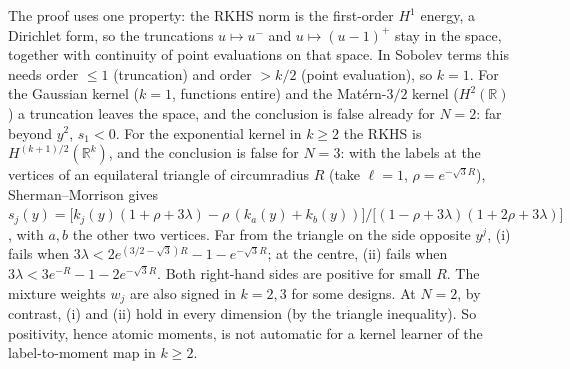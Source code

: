 \begin{remark}[Scope: the lemma is a $k=1$ result]
The proof uses one property: the RKHS norm is the first-order $H^1$ energy, a Dirichlet form, so
the truncations $u\mapsto u^-$ and $u\mapsto(u-1)^+$ stay in the space, together with continuity
of point evaluations on that space. In Sobolev terms this needs order $\le1$ (truncation) and
order $>k/2$ (point evaluation), so $k=1$. For the Gaussian kernel ($k=1$, functions entire) and
the Mat\'ern-$3/2$ kernel ($H^2(\mathbb R)$) a truncation leaves the space, and the conclusion is
false already for $N=2$: far beyond $y^2$, $s_1<0$. For the exponential kernel in $k\ge2$ the
RKHS is $H^{(k+1)/2}(\mathbb R^k)$, and the conclusion is false for $N=3$: with the labels at the
vertices of an equilateral triangle of circumradius $R$ (take $\ell=1$, $\rho=e^{-\sqrt3R}$),
Sherman--Morrison gives
$s_j(y)=\big[k_j(y)(1+\rho+3\lambda)-\rho\,(k_a(y)+k_b(y))\big]/\big[(1-\rho+3\lambda)(1+2\rho+3\lambda)\big]$,
with $a,b$ the other two vertices. Far from the triangle on the side opposite $y^j$, (i) fails when
$3\lambda<2e^{(3/2-\sqrt3)R}-1-e^{-\sqrt3R}$; at the centre, (ii) fails when
$3\lambda<3e^{-R}-1-2e^{-\sqrt3R}$. Both right-hand sides are positive for small $R$. The
mixture weights $w_j$ are also signed in $k=2,3$ for some designs. At $N=2$, by contrast, (i) and
(ii) hold in every dimension (by the triangle inequality). So positivity, hence atomic
moments, is not automatic for a kernel learner of the label-to-moment map in $k\ge2$.
\end{remark}
